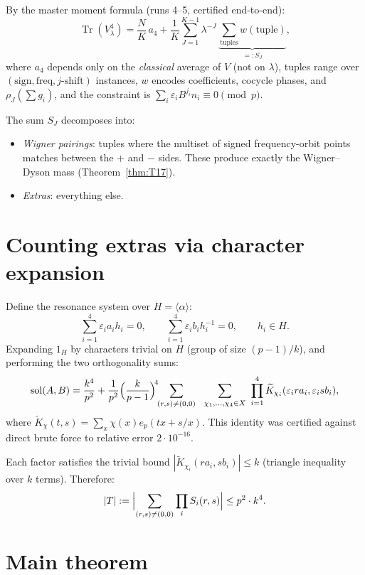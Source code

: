 \documentclass[11pt]{article}
\numberwithin{equation}{section}
\begin{document}
By the master moment formula (runs 4--5, certified end-to-end):
\begin{equation}\label{eq:M4}
\operatorname{Tr}(V_\lambda^4)
= \frac{N}{K}\,a_4 + \frac{1}{K}\sum_{J=1}^{K-1}\lambda^{-J}\,
\underbrace{\sum_{\text{tuples}} w(\text{tuple})}_{=:S_J},
\end{equation}
where $a_4$ depends only on the \emph{classical} average of $V$
(not on $\lambda$), tuples range over $(\text{sign},\text{freq},
j\text{-shift})$ instances, $w$ encodes coefficients, cocycle phases,
and $\rho_J(\sum g_i)$, and the constraint is
$\sum_i \varepsilon_i B^{j_i} n_i \equiv 0 \pmod p$.

The sum $S_J$ decomposes into:
\begin{itemize}
\item \emph{Wigner pairings}: tuples where the multiset of signed
frequency-orbit points matches between the $+$ and $-$ sides.
These produce exactly the Wigner--Dyson mass (Theorem~\ref{thm:T17}).
\item \emph{Extras}: everything else.
\end{itemize}

\section{Counting extras via character expansion}

Define the resonance system over $H = \langle\alpha\rangle$:
\[
\sum_{i=1}^4 \varepsilon_i a_i h_i = 0, \qquad
\sum_{i=1}^4 \varepsilon_i b_i h_i^{-1} = 0,
\qquad h_i \in H.
\]
Expanding $1_H$ by characters trivial on $H$ (group of size
$(p{-}1)/k$), and performing the two orthogonality sums:
\begin{equation}\label{eq:reduction}
\mathrm{sol}(A,B) = \frac{k^4}{p^2} +
\frac{1}{p^2}\Bigl(\frac{k}{p-1}\Bigr)^{\!4}\!\!
\sum_{\substack{(r,s)\ne(0,0)}}\ \
\sum_{\chi_1,\ldots,\chi_4 \in X}\ \prod_{i=1}^4
\widetilde K_{\chi_i}(\varepsilon_i r a_i,\varepsilon_i s b_i),
\end{equation}
where $\widetilde K_\chi(t,s) = \sum_x \chi(x)e_p(tx+s/x)$.
This identity was certified against direct brute force to relative
error $2\cdot 10^{-16}$.

Each factor satisfies the trivial bound
$|\widetilde K_{\chi_i}(ra_i,sb_i)| \le k$ (triangle inequality over
$k$ terms).  Therefore:
\[
|T| := \Bigl|\sum_{(r,s)\ne(0,0)} \prod_i S_i(r,s)\Bigr|
\le p^2 \cdot k^4.
\]

\section{Main theorem}
\end{document}
